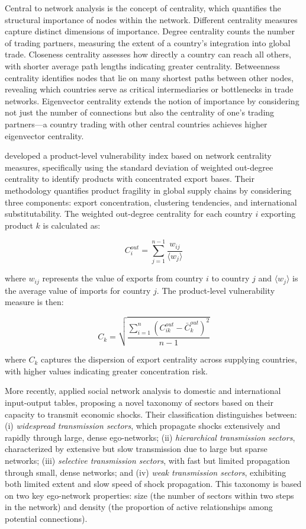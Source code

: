 \documentclass[final,1p,times,authoryear]{elsarticle}
\begin{document}
Central to network analysis is the concept of centrality, which quantifies the structural importance of nodes within the network. Different centrality measures capture distinct dimensions of importance. Degree centrality counts the number of trading partners, measuring the extent of a country's integration into global trade. Closeness centrality assesses how directly a country can reach all others, with shorter average path lengths indicating greater centrality. Betweenness centrality identifies nodes that lie on many shortest paths between other nodes, revealing which countries serve as critical intermediaries or bottlenecks in trade networks. Eigenvector centrality extends the notion of importance by considering not just the number of connections but also the centrality of one's trading partners—a country trading with other central countries achieves higher eigenvector centrality.

\cite{Korniyenko2017} developed a product-level vulnerability index based on network centrality measures, specifically using the standard deviation of weighted out-degree centrality to identify products with concentrated export bases. Their methodology quantifies product fragility in global supply chains by considering three components: export concentration, clustering tendencies, and international substitutability. The weighted out-degree centrality for each country $i$ exporting product $k$ is calculated as:

\begin{equation}
C_{i}^{out} = \sum_{j=1}^{n-1} \frac{w_{ij}}{\langle w_j \rangle}
\end{equation}

where $w_{ij}$ represents the value of exports from country $i$ to country $j$ and $\langle w_j \rangle$ is the average value of imports for country $j$. The product-level vulnerability measure is then:

\begin{equation}
C_k = \sqrt{\frac{\sum_{i=1}^{n} (C_{ik}^{out} - \bar{C}_k^{out})^2}{n-1}}
\end{equation}

where $C_k$ captures the dispersion of export centrality across supplying countries, with higher values indicating greater concentration risk.

More recently, \cite{Costa2022} applied social network analysis to domestic and international input-output tables, proposing a novel taxonomy of sectors based on their capacity to transmit economic shocks. Their classification distinguishes between: (i) \textit{widespread transmission sectors}, which propagate shocks extensively and rapidly through large, dense ego-networks; (ii) \textit{hierarchical transmission sectors}, characterized by extensive but slow transmission due to large but sparse networks; (iii) \textit{selective transmission sectors}, with fast but limited propagation through small, dense networks; and (iv) \textit{weak transmission sectors}, exhibiting both limited extent and slow speed of shock propagation. This taxonomy is based on two key ego-network properties: size (the number of sectors within two steps in the network) and density (the proportion of active relationships among potential connections).
\end{document}
